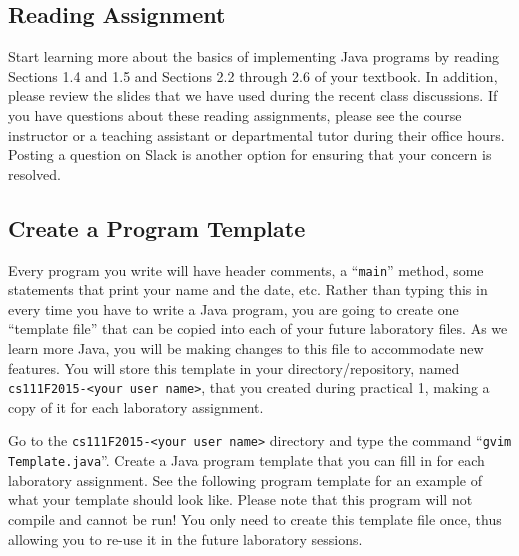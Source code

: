 \subsection*{Reading Assignment}

Start learning more about the basics of implementing Java programs by reading Sections 1.4 and 1.5 and Sections 2.2
through 2.6 of your textbook. In addition, please review the slides that we have used during the recent class
discussions. If you have questions about these reading assignments, please see the course instructor or a teaching
assistant or departmental tutor during their office hours. Posting a question on Slack is another option for ensuring
that your concern is resolved.

\vspace*{-.15in}

\subsection*{Create a Program Template}

Every program you write will have header comments, a ``{\tt main}'' method, some statements that print your name and the
date, etc. Rather than typing this in every time you have to write a Java program, you are going to create one
``template file'' that can be copied into each of your future laboratory files. As we learn more Java, you will be
making changes to this file to accommodate new features. You will store this template in your directory/repository,
named {\tt cs111F2015-<your user name>}, that you created during practical 1, making a copy of it for each laboratory
assignment.

\begin{sloppypar} Go to the {\tt cs111F2015-<your user name>} directory and type the command ``{\tt gvim
  Template.java}''.  Create a Java program template that you can fill in for each laboratory assignment.  See the
  following program template for an example of what your template should look like.  Please note that this program will not
  compile and cannot be run!  You only need to create this template file once, thus allowing you to re-use it in the
future laboratory sessions.  \end{sloppypar}

